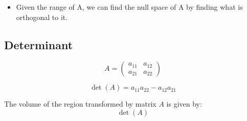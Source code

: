 \begin{example}
    \begin{itemize}
        \item Given the range of A, we can find the null space of A by finding what is orthogonal to it. 
    \end{itemize}
\end{example}

\subsection{Determinant}
\begin{definition}
    \begin{equation}
    A = \begin{pmatrix} a_{11} & a_{12} \\ a_{21} & a_{22} \end{pmatrix}
    \end{equation}

    \begin{equation}
    \det(A) = a_{11}a_{22} - a_{12}a_{21}
    \end{equation}

    The volume of the region transformed by matrix $A$ is given by:
    \begin{equation}
    \det(A)
    \end{equation}
\end{definition}

